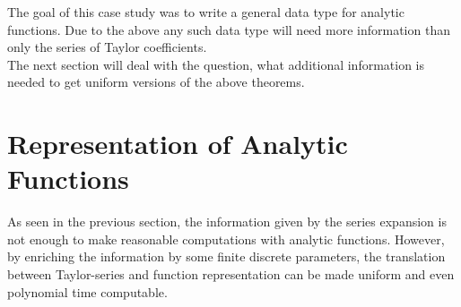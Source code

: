 		The goal of this case study was to write a general data type for analytic functions. 
		Due to the above any such data type will need more information than only the series of Taylor coefficients. \\
		The next section will deal with the question, what additional information is needed to get uniform versions of the above theorems.

	\section{Representation of Analytic Functions}
	 As seen in the previous section, the information given by the series expansion is not enough to make reasonable computations with analytic functions.
	 However, by enriching the information by some finite discrete parameters, the translation between Taylor-series and function representation can be made uniform 
   and even polynomial time computable.
	 
